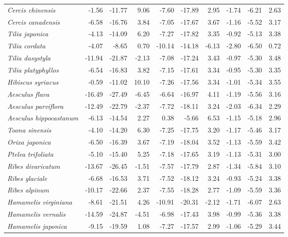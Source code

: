 \documentclass[11pt]{article}
\begin{document}
\begin{longtable}{lrrrrrrrrr}
  \emph{Cercis chinensis} & -1.56 & -11.77 & 9.06 & -7.60 & -17.89 & 2.95 & -1.74 & -6.21 & 2.63 \\ 
  \emph{Cercis canadensis} & -6.58 & -16.76 & 3.84 & -7.05 & -17.67 & 3.67 & -1.16 & -5.52 & 3.17 \\ 
  \emph{Tilia japonica} & -4.13 & -14.09 & 6.20 & -7.27 & -17.82 & 3.35 & -0.92 & -5.13 & 3.38 \\ 
  \emph{Tilia cordata} & -4.07 & -8.65 & 0.70 & -10.14 & -14.18 & -6.13 & -2.80 & -6.50 & 0.72 \\ 
  \emph{Tilia dasystyla} & -11.94 & -21.87 & -2.13 & -7.08 & -17.24 & 3.43 & -0.97 & -5.30 & 3.48 \\ 
  \emph{Tilia platyphyllos} & -6.54 & -16.83 & 3.82 & -7.15 & -17.61 & 3.34 & -0.95 & -5.30 & 3.35 \\ 
  \emph{Hibiscus syriacus} & -0.59 & -11.02 & 10.10 & -7.26 & -17.56 & 3.34 & -1.01 & -5.34 & 3.55 \\ 
  \emph{Aesculus flava} & -16.49 & -27.49 & -6.45 & -6.64 & -16.97 & 4.11 & -1.19 & -5.56 & 3.16 \\ 
  \emph{Aesculus parviflora} & -12.49 & -22.79 & -2.37 & -7.72 & -18.11 & 3.24 & -2.03 & -6.34 & 2.29 \\ 
  \emph{Aesculus hippocastanum} & -6.13 & -14.54 & 2.27 & 0.38 & -5.66 & 6.53 & -1.15 & -5.18 & 2.96 \\ 
  \emph{Toona sinensis} & -4.10 & -14.20 & 6.30 & -7.25 & -17.75 & 3.20 & -1.17 & -5.46 & 3.17 \\ 
  \emph{Orixa japonica} & -6.50 & -16.39 & 3.67 & -7.19 & -18.04 & 3.52 & -1.13 & -5.59 & 3.42 \\ 
  \emph{Ptelea trifoliata} & -5.10 & -15.40 & 5.25 & -7.18 & -17.65 & 3.19 & -1.13 & -5.31 & 3.00 \\ 
  \emph{Ribes divaricatum} & -13.67 & -26.45 & -1.51 & -7.57 & -17.79 & 2.87 & -1.34 & -5.84 & 3.10 \\ 
  \emph{Ribes glaciale} & -6.68 & -16.53 & 3.71 & -7.52 & -18.12 & 3.24 & -0.93 & -5.24 & 3.38 \\ 
  \emph{Ribes alpinum} & -10.17 & -22.66 & 2.37 & -7.55 & -18.28 & 2.77 & -1.09 & -5.59 & 3.36 \\ 
  \emph{Hamamelis virginiana} & -8.61 & -21.51 & 4.26 & -10.91 & -20.31 & -2.12 & -1.71 & -6.07 & 2.63 \\ 
  \emph{Hamamelis vernalis} & -14.59 & -24.87 & -4.51 & -6.98 & -17.43 & 3.98 & -0.99 & -5.36 & 3.38 \\ 
  \emph{Hamamelis japonica} & -9.15 & -19.59 & 1.08 & -7.27 & -17.57 & 2.99 & -1.06 & -5.29 & 3.44 \\ 

\end{longtable}
\end{document}
